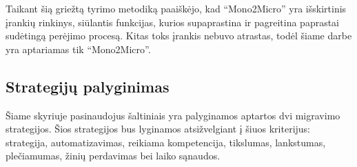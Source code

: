 \documentclass{VUMIFPSbakalaurinis}
\begin{document}
Taikant šią griežtą tyrimo metodiką paaiškėjo, kad \enquote{Mono2Micro} yra išskirtinis įrankių rinkinys, siūlantis funkcijas, kurios supaprastina ir pagreitina paprastai sudėtingą perėjimo procesą. Kitas toks įrankis nebuvo atrastas, todėl šiame darbe yra aptariamas tik \enquote{Mono2Micro}.

\subsection{Strategijų palyginimas}
Šiame skyriuje pasinaudojus šaltiniais yra palyginamos aptartos dvi migravimo strategijos. Šios strategijos bus lyginamos atsižvelgiant į šiuos kriterijus: strategija, automatizavimas, reikiama kompetencija, tikslumas, lankstumas, plečiamumas, žinių perdavimas bei laiko sąnaudos.

\renewcommand{\arraystretch}{1.5} %
\end{document}
